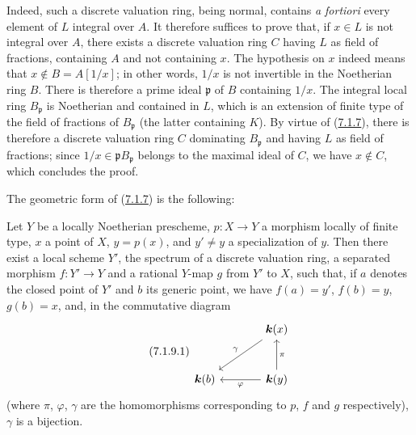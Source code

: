Indeed, such a discrete valuation ring, being normal, contains
\emph{a fortiori} every element of $L$ integral over $A$. It therefore
suffices to prove that, if $x\in L$ is not integral over $A$, there exists a
discrete valuation ring $C$ having $L$ as field of fractions, containing $A$
and not containing $x$. The hypothesis on $x$ indeed means that
$x\notin B=A[1/x]$; in other words, $1/x$ is not invertible in the
Noetherian ring $B$. There is therefore a prime ideal $\mathfrak{p}$ of $B$
containing $1/x$. The integral local ring $B_{\mathfrak{p}}$ is Noetherian and
contained in $L$, which is an extension of finite type of the field of
fractions of $B_{\mathfrak{p}}$ (the latter containing $K$). By virtue of
(\hyperref[II.7.1.7]{7.1.7}), there is therefore a discrete valuation ring
$C$ dominating $B_{\mathfrak{p}}$ and having $L$ as field of fractions;
since $1/x\in\mathfrak{p}B_{\mathfrak{p}}$ belongs to the maximal ideal of
$C$, we have $x\notin C$, which concludes the proof.

The geometric form of (\hyperref[II.7.1.7]{7.1.7}) is the following:

\begin{proposition}[7.1.9]
\label{II.7.1.9}
Let $Y$ be a locally Noetherian prescheme, $p:X\to Y$ a morphism
locally of finite type, $x$ a point of $X$, $y=p(x)$, and $y'\neq y$ a
specialization of $y$. Then there exist a local scheme $Y'$, the spectrum of a
discrete valuation ring, a separated morphism $f:Y'\to Y$ and a
rational $Y$-map $g$ from $Y'$ to $X$, such that, if $a$ denotes the
closed point of $Y'$ and $b$ its generic point, we have $f(a)=y'$,
$f(b)=y$, $g(b)=x$, and, in the commutative diagram
\[
\tag{7.1.9.1}
\label{II.7.1.9.1}
\begin{tikzcd}[column sep=large,row sep=large]
& \boldsymbol{k}(x) \arrow[dl,"\gamma"'] \\
\boldsymbol{k}(b) & \boldsymbol{k}(y) \arrow[u,"\pi"'] \arrow[l,"\varphi"]
\end{tikzcd}
\]
(where $\pi$, $\varphi$, $\gamma$ are the homomorphisms corresponding
to $p$, $f$ and $g$ respectively), $\gamma$ is a bijection.
\end{proposition}

